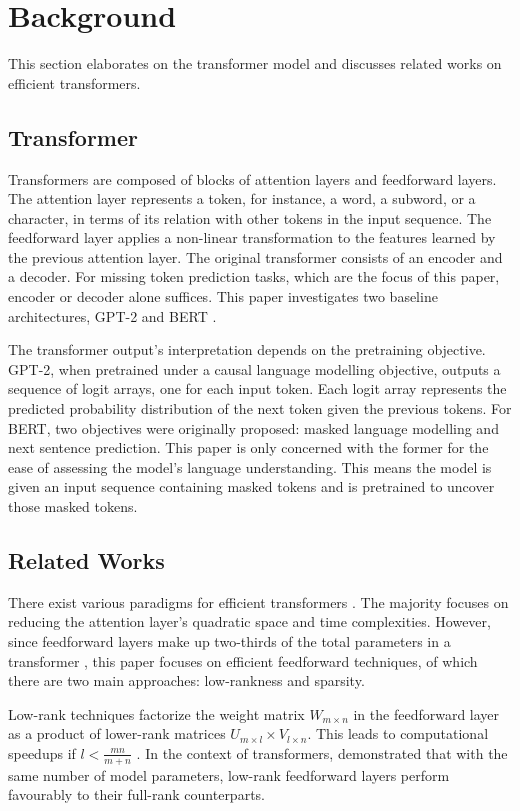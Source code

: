 \section{Background}
\label{sec:background}
This section elaborates on the transformer model and discusses related works on efficient transformers.
\subsection{Transformer}
Transformers \cite{vaswani_attention_2017} are composed of blocks of attention layers and feedforward layers. The attention layer represents a token, for instance, a word, a subword, or a character, in terms of its relation with other tokens in the input sequence. The feedforward layer applies a non-linear transformation to the features learned by the previous attention layer. The original transformer \cite{vaswani_attention_2017} consists of an encoder and a decoder. For missing token prediction tasks, which are the focus of this paper, encoder or decoder alone suffices. This paper investigates two baseline architectures, GPT-2 \cite{radford_language_2019} and BERT \cite{devlin_bert_2019}. 

The transformer output's interpretation depends on the pretraining objective. GPT-2, when pretrained under a causal language modelling objective, outputs a sequence of logit arrays, one for each input token. Each logit array represents the predicted probability distribution of the next token given the previous tokens. For BERT, two objectives were originally proposed: masked language modelling and next sentence prediction. This paper is only concerned with the former for the ease of assessing the model's language understanding. This means the model is given an input sequence containing masked tokens and is pretrained to uncover those masked tokens.
\subsection{Related Works}
There exist various paradigms for efficient transformers \cite{tay_efficient_2022}. The majority focuses on reducing the attention layer's quadratic space and time complexities. However, since feedforward layers make up two-thirds of the total parameters in a transformer \cite{pires_one_2023}, this paper focuses on efficient feedforward techniques, of which there are two main approaches: low-rankness and sparsity.

Low-rank techniques factorize the weight matrix $W_{m\times n}$ in the feedforward layer as a product of lower-rank matrices $U_{m\times l}\times V_{l\times n}$. This leads to computational speedups if $l <\frac{mn}{m+n}$ \cite{kamalakara_exploring_2022}. In the context of transformers, \cite{winata_lightweight_2020} demonstrated that with the same number of model parameters, low-rank feedforward layers perform favourably to their full-rank counterparts.

